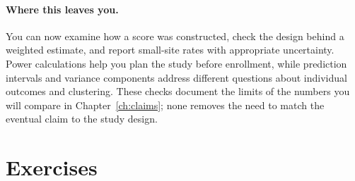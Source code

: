 \paragraph{Where this leaves you.} You can now examine how a score was constructed, check the design behind a weighted estimate, and report small-site rates with appropriate uncertainty. Power calculations help you plan the study before enrollment, while prediction intervals and variance components address different questions about individual outcomes and clustering. These checks document the limits of the numbers you will compare in Chapter~\ref{ch:claims}; none removes the need to match the eventual claim to the study design.

\section*{Exercises}
